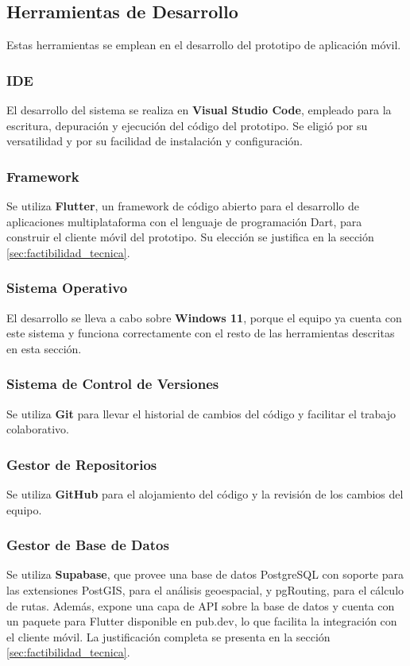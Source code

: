 \subsection{Herramientas de Desarrollo}
Estas herramientas se emplean en el desarrollo del prototipo de aplicación móvil.

\subsubsection{IDE}
El desarrollo del sistema se realiza en \textbf{Visual Studio Code}, empleado para la escritura, depuración y ejecución del código del prototipo. Se eligió por su versatilidad y por su facilidad de instalación y configuración.

\subsubsection{Framework}
Se utiliza \textbf{Flutter}, un framework de código abierto para el desarrollo de aplicaciones multiplataforma con el lenguaje de programación Dart\cite{flutter_businessvalue}, para construir el cliente móvil del prototipo. Su elección se justifica en la sección \ref{sec:factibilidad_tecnica}.

\subsubsection{Sistema Operativo}
El desarrollo se lleva a cabo sobre \textbf{Windows 11}, porque el equipo ya cuenta con este sistema y funciona correctamente con el resto de las herramientas descritas en esta sección.

\subsubsection{Sistema de Control de Versiones}
Se utiliza \textbf{Git} para llevar el historial de cambios del código y facilitar el trabajo colaborativo.

\subsubsection{Gestor de Repositorios}
Se utiliza \textbf{GitHub} para el alojamiento del código y la revisión de los cambios del equipo.

\subsubsection{Gestor de Base de Datos}
Se utiliza \textbf{Supabase}, que provee una base de datos PostgreSQL con soporte para las extensiones PostGIS, para el análisis geoespacial, y pgRouting, para el cálculo de rutas. Además, expone una capa de API sobre la base de datos y cuenta con un paquete para Flutter disponible en pub.dev, lo que facilita la integración con el cliente móvil. La justificación completa se presenta en la sección \ref{sec:factibilidad_tecnica}.

